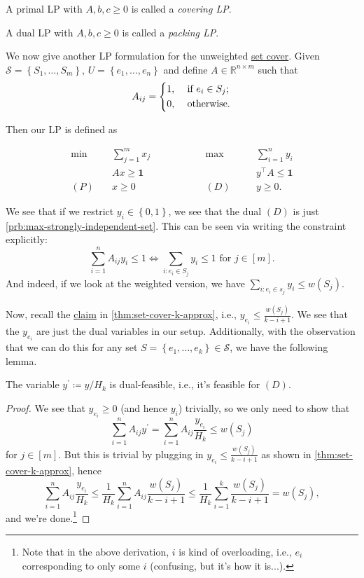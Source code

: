 \begin{definition}[Covering LP]\label{def:covering-LP}
	A primal LP with \(A, b, c \geq 0\) is called a \emph{covering LP}.
\end{definition}

\begin{definition}[Packing LP]\label{def:packing-LP}
	A dual LP with \(A, b, c \geq 0\) is called a \emph{packing LP}.
\end{definition}

We now give another LP formulation for the unweighted \hyperref[prb:set-cover]{set cover}. Given \(\mathcal{S} = \left\{ S_1, \dots , S_m  \right\} \), \(U = \left\{ e_1, \dots , e_n  \right\} \) and define \(A\in \mathbb{R} ^{n\times m}\) such that
\[
	A_{ij} = \begin{dcases}
		1, & \text{ if } e_i\in S_j ; \\
		0, & \text{ otherwise}.
	\end{dcases}
\]

Then our LP is defined as

\[
	\begin{alignedat}{5}
		\min~&\sum_{j=1}^{m} x_j\qquad\qquad&&\max ~&&\sum_{i =1}^{n} y_i\\
		&Ax \geq \bm{1} 				&&		&&y^{\top}A\leq \bm{1}\\
		(P)\quad	&x\geq  0 	&&(D)\quad&& y \geq 0.
	\end{alignedat}
\]

We see that if we restrict \(y_i\in \left\{ 0, 1 \right\} \), we see that the dual \((D)\) is just \autoref{prb:max-strongly-independent-set}. This can be seen via writing the constraint explicitly:
\[
	\sum_{i=1}^{n} A_{ij} y_{i} \leq 1 \iff \sum_{i\colon e_i\in S_j} y_{i} \leq 1 \text{ for } j\in[m].
\]
And indeed, if we look at the weighted version, we have \(\sum_{i\colon e_i\in s_j} y_{i} \leq w(S_j)\).

Now, recall the \hyperref[clm:set-cover-cost]{claim} in \autoref{thm:set-cover-k-approx}, i.e., \(y_{e_i} \leq \frac{w(S_{j})}{k - i + 1}\). We see that the \(y_{e_i} \) are just the dual variables in our setup. Additionally, with the observation that we can do this for any set \(S = \left\{ e_1, \dots , e_k\right\} \in \mathcal{S}\), we have the following lemma.
\begin{lemma}\label{lma:lec3-1}
	The variable \(y^\prime \coloneqq y/H_k\) is dual-feasible, i.e., it's feasible for \((D)\).
\end{lemma}
\begin{proof}
	We see that \(y_{e_i} \geq 0\) (and hence \(y_i\)) trivially, so we only need to show that
	\[
		\sum_{i=1}^{n} A_{ij}y^\prime = \sum_{i=1}^{n} A_{ij}\frac{y_{e_i}}{H_k} \leq w(S_{j})
	\]
	for \(j\in [m]\). But this is trivial by plugging in \(y_{e_i} \leq \frac{w(S_j)}{k - i + 1}\) as shown in \autoref{thm:set-cover-k-approx}, hence
	\[
		\sum_{i=1}^{n} A_{ij} \frac{y_{e_i} }{H_k} \leq \frac{1}{H_k}\sum_{i=1}^{n} A_{ij} \frac{w(S_j) }{k - i + 1} \leq \frac{1}{H_k}\sum_{i=1}^{k} \frac{w(S_j)}{k - i + 1} = w(S_j),
	\]
	and we're done.\footnote{Note that in the above derivation, \(i\) is kind of overloading, i.e., \(e_i\) corresponding to only some \(i\) (confusing, but it's how it is...).}
\end{proof}

